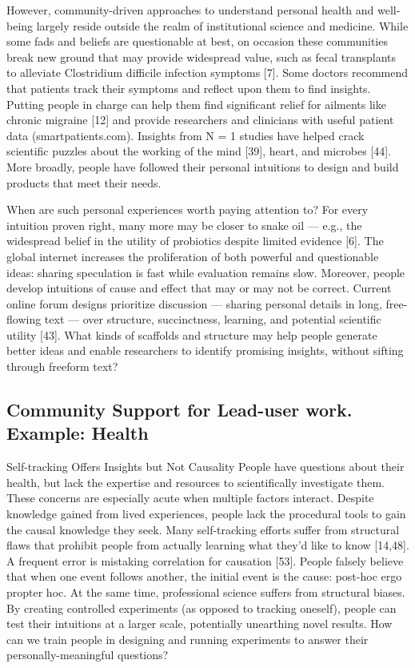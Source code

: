 However, community-driven approaches to understand personal
health and well-being largely reside outside the realm
of institutional science and medicine. While some fads and
beliefs are questionable at best, on occasion these communities
break new ground that may provide widespread value,
such as fecal transplants to alleviate Clostridium difficile infection
symptoms [7]. Some doctors recommend that patients
track their symptoms and reflect upon them to find
insights. Putting people in charge can help them find significant
relief for ailments like chronic migraine [12] and provide
researchers and clinicians with useful patient data
(smartpatients.com). Insights from N = 1 studies have helped
crack scientific puzzles about the working of the mind [39],
heart, and microbes [44]. More broadly, people have
followed their personal intuitions to design and build
products that meet their needs.

When are such personal experiences worth paying attention
to? For every intuition proven right, many more may be
closer to snake oil — e.g., the widespread belief in the utility
of probiotics despite limited evidence [6]. The global internet
increases the proliferation of both powerful and questionable
ideas: sharing speculation is fast while evaluation remains
slow. Moreover, people develop intuitions of cause and effect
that may or may not be correct. Current online forum
designs prioritize discussion — sharing personal details in
long, free-flowing text — over structure, succinctness, learning,
and potential scientific utility [43]. What kinds of scaffolds
and structure may help people generate better ideas and
enable researchers to identify promising insights, without
sifting through freeform text?

\subsection{Community Support for Lead-user work. Example: Health}
Self-tracking Offers Insights but Not Causality
People have questions about their health, but lack the expertise and resources to scientifically
investigate them. These concerns are especially acute when multiple factors interact. Despite
knowledge gained from lived experiences, people lack the procedural tools to gain the causal
knowledge they seek. Many self-tracking efforts suffer from structural flaws that prohibit people
from actually learning what they’d like to know [14,48]. A frequent error is mistaking correlation
for causation [53]. People falsely believe that when one event follows another, the initial event is
the cause: post-hoc ergo propter hoc. At the same time, professional science suffers from structural
biases. By creating controlled experiments (as opposed to tracking oneself), people can test their
intuitions at a larger scale, potentially unearthing novel results. How can we train people in designing
and running experiments to answer their personally-meaningful questions?

